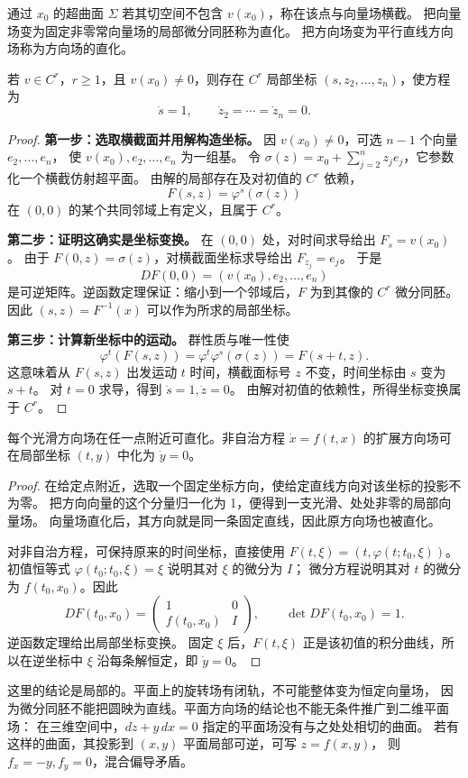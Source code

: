 \begin{definition}
通过 $x_0$ 的超曲面 $\Sigma$ 若其切空间不包含 $v(x_0)$，称在该点与向量场横截。
把向量场变为固定非零常向量场的局部微分同胚称为直化。
把方向场变为平行直线方向场称为方向场的直化。
\end{definition}
\begin{theorem}[向量场直化]\label{thm:arnold-flowbox}
若 $v\in C^r$，$r\geq1$，且 $v(x_0)\ne0$，则存在 $C^r$ 局部坐标
$(s,z_2,\ldots,z_n)$，使方程为
\[
 \dot s=1,\qquad \dot z_2=\cdots=\dot z_n=0.
\]
\end{theorem}
\begin{proof}
\textbf{第一步：选取横截面并用解构造坐标。}
因 $v(x_0)\ne0$，可选 $n-1$ 个向量 $e_2,\ldots,e_n$，
使 $v(x_0),e_2,\ldots,e_n$ 为一组基。
令 $\sigma(z)=x_0+\sum_{j=2}^nz_je_j$，它参数化一个横截仿射超平面。
由解的局部存在及对初值的 $C^r$ 依赖，
\[
 F(s,z)=\varphi^s(\sigma(z))
\]
在 $(0,0)$ 的某个共同邻域上有定义，且属于 $C^r$。

\textbf{第二步：证明这确实是坐标变换。}
在 $(0,0)$ 处，对时间求导给出 $F_s=v(x_0)$。
由于 $F(0,z)=\sigma(z)$，对横截面坐标求导给出 $F_{z_j}=e_j$。
于是
\[
 DF(0,0)=(v(x_0),e_2,\ldots,e_n)
\]
是可逆矩阵。逆函数定理保证：缩小到一个邻域后，$F$ 为到其像的 $C^r$ 微分同胚。
因此 $(s,z)=F^{-1}(x)$ 可以作为所求的局部坐标。

\textbf{第三步：计算新坐标中的运动。}
群性质与唯一性使
\[
 \varphi^t(F(s,z))=\varphi^t\varphi^s(\sigma(z))
 =F(s+t,z).
\]
这意味着从 $F(s,z)$ 出发运动 $t$ 时间，横截面标号 $z$ 不变，时间坐标由 $s$ 变为 $s+t$。
对 $t=0$ 求导，得到 $\dot s=1,\dot z=0$。
由解对初值的依赖性，所得坐标变换属于 $C^r$。
\end{proof}
\begin{corollary}[方向场直化]
每个光滑方向场在任一点附近可直化。非自治方程
$\dot x=f(t,x)$ 的扩展方向场可在局部坐标 $(t,y)$ 中化为 $\dot y=0$。
\end{corollary}
\begin{proof}
在给定点附近，选取一个固定坐标方向，使给定直线方向对该坐标的投影不为零。
把方向向量的这个分量归一化为 1，便得到一支光滑、处处非零的局部向量场。
向量场直化后，其方向就是同一条固定直线，因此原方向场也被直化。

对非自治方程，可保持原来的时间坐标，直接使用
$F(t,\xi)=(t,\varphi(t;t_0,\xi))$。
初值恒等式 $\varphi(t_0;t_0,\xi)=\xi$ 说明其对 $\xi$ 的微分为 $I$；
微分方程说明其对 $t$ 的微分为 $f(t_0,x_0)$。因此
\[
 DF(t_0,x_0)=\begin{pmatrix}1&0\\f(t_0,x_0)&I\end{pmatrix},
 \qquad \det DF(t_0,x_0)=1.
\]
逆函数定理给出局部坐标变换。
固定 $\xi$ 后，$F(t,\xi)$ 正是该初值的积分曲线，所以在逆坐标中
$\xi$ 沿每条解恒定，即 $\dot y=0$。
\end{proof}
这里的结论是局部的。平面上的旋转场有闭轨，不可能整体变为恒定向量场，
因为微分同胚不能把圆映为直线。平面方向场的结论也不能无条件推广到二维平面场：
在三维空间中，$dz+y\,dx=0$ 指定的平面场没有与之处处相切的曲面。
若有这样的曲面，其投影到 $(x,y)$ 平面局部可逆，可写 $z=f(x,y)$，
则 $f_x=-y,f_y=0$，混合偏导矛盾。

